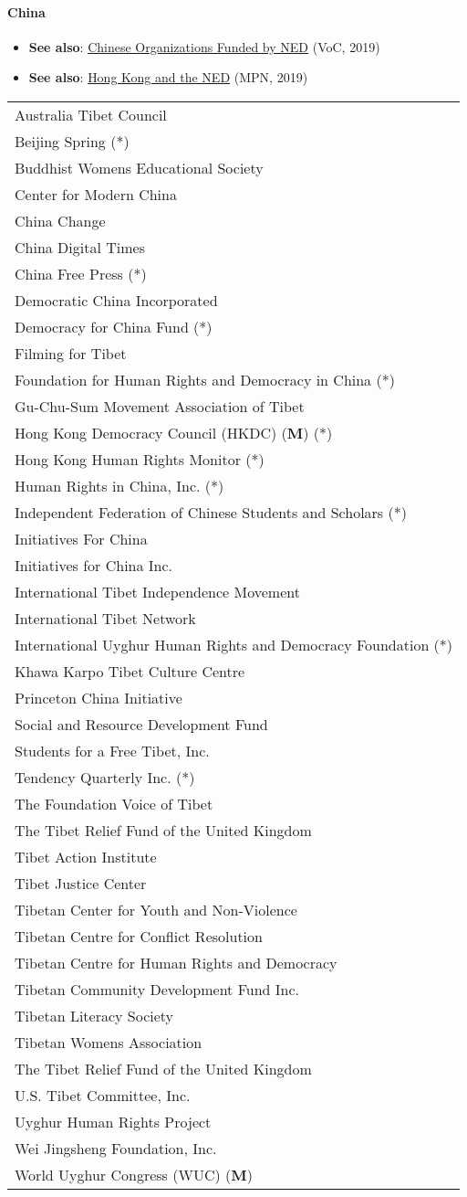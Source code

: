 \hypertarget{china}{%
\paragraph{China}\label{china}}

\begin{itemize}
\tightlist
\item
  \textbf{See also}:
  \href{https://www.viewofchina.com/list-ned/}{Chinese Organizations
  Funded by NED} (VoC, 2019)
\item
  \textbf{See also}:
  \href{https://www.mintpressnews.com/hong-kong-protest-united-states-destabilize-china/261712/}{Hong
  Kong and the NED} (MPN, 2019)
\end{itemize}

\begin{longtable}[]{@{}l@{}}
\toprule
\endhead
Australia Tibet Council\tabularnewline
Beijing Spring (*)\tabularnewline
Buddhist Womens Educational Society\tabularnewline
Center for Modern China\tabularnewline
China Change\tabularnewline
China Digital Times\tabularnewline
China Free Press (*)\tabularnewline
Democratic China Incorporated\tabularnewline
Democracy for China Fund (*)\tabularnewline
Filming for Tibet\tabularnewline
Foundation for Human Rights and Democracy in China (*)\tabularnewline
Gu-Chu-Sum Movement Association of Tibet\tabularnewline
Hong Kong Democracy Council (HKDC) (\textbf{M}) (*)\tabularnewline
Hong Kong Human Rights Monitor (*)\tabularnewline
Human Rights in China, Inc. (*)\tabularnewline
Independent Federation of Chinese Students and Scholars
(*)\tabularnewline
Initiatives For China\tabularnewline
Initiatives for China Inc.\tabularnewline
International Tibet Independence Movement\tabularnewline
International Tibet Network\tabularnewline
International Uyghur Human Rights and Democracy Foundation
(*)\tabularnewline
Khawa Karpo Tibet Culture Centre\tabularnewline
Princeton China Initiative\tabularnewline
Social and Resource Development Fund\tabularnewline
Students for a Free Tibet, Inc.\tabularnewline
Tendency Quarterly Inc. (*)\tabularnewline
The Foundation Voice of Tibet\tabularnewline
The Tibet Relief Fund of the United Kingdom\tabularnewline
Tibet Action Institute\tabularnewline
Tibet Justice Center\tabularnewline
Tibetan Center for Youth and Non-Violence\tabularnewline
Tibetan Centre for Conflict Resolution\tabularnewline
Tibetan Centre for Human Rights and Democracy\tabularnewline
Tibetan Community Development Fund Inc.\tabularnewline
Tibetan Literacy Society\tabularnewline
Tibetan Womens Association\tabularnewline
The Tibet Relief Fund of the United Kingdom\tabularnewline
U.S. Tibet Committee, Inc.\tabularnewline
Uyghur Human Rights Project\tabularnewline
Wei Jingsheng Foundation, Inc.\tabularnewline
World Uyghur Congress (WUC) (\textbf{M})\tabularnewline
\bottomrule
\end{longtable}

